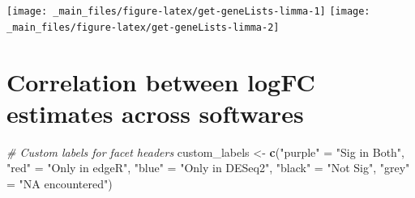 \documentclass[
]{book}
\newenvironment{Shaded}{\begin{snugshade}}{\end{snugshade}}
\newcommand{\CommentTok}[1]{\textcolor[rgb]{0.56,0.35,0.01}{\textit{#1}}}
\newcommand{\FunctionTok}[1]{\textcolor[rgb]{0.13,0.29,0.53}{\textbf{#1}}}
\newcommand{\NormalTok}[1]{#1}
\newcommand{\OtherTok}[1]{\textcolor[rgb]{0.56,0.35,0.01}{#1}}
\newcommand{\StringTok}[1]{\textcolor[rgb]{0.31,0.60,0.02}{#1}}
\begin{document}
\texttt{[image: \_main\_files/figure-latex/get-geneLists-limma-1]} \texttt{[image: \_main\_files/figure-latex/get-geneLists-limma-2]}

\hypertarget{correlation-between-logfc-estimates-across-softwares}{%
\section{Correlation between logFC estimates across softwares}\label{correlation-between-logfc-estimates-across-softwares}}

\begin{Shaded}
\begin{Highlighting}[]
\CommentTok{\# Custom labels for facet headers}
\NormalTok{custom\_labels }\OtherTok{\textless{}{-}} \FunctionTok{c}\NormalTok{(}\StringTok{"purple"} \OtherTok{=} \StringTok{"Sig in Both"}\NormalTok{,}
                   \StringTok{"red"} \OtherTok{=} \StringTok{"Only in edgeR"}\NormalTok{,}
                   \StringTok{"blue"} \OtherTok{=} \StringTok{"Only in DESeq2"}\NormalTok{,}
                   \StringTok{"black"} \OtherTok{=} \StringTok{"Not Sig"}\NormalTok{,}
                   \StringTok{"grey"} \OtherTok{=} \StringTok{"NA encountered"}\NormalTok{)}



\end{Highlighting}
\end{Shaded}
\end{document}
